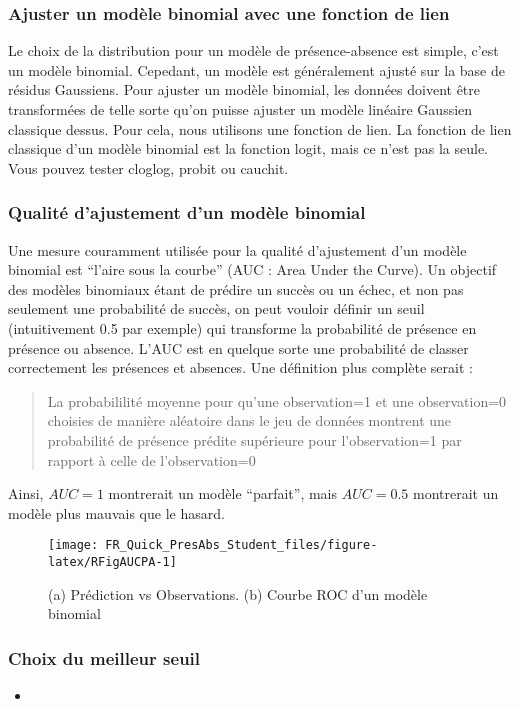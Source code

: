 \documentclass[french,a4paper]{article}
\providecommand{\tightlist}{%
  \setlength{\itemsep}{0pt}\setlength{\parskip}{0pt}}
\begin{document}
\subsubsection{Ajuster un modèle binomial avec une fonction de
lien}\label{ajuster-un-modele-binomial-avec-une-fonction-de-lien}

Le choix de la distribution pour un modèle de présence-absence est
simple, c'est un modèle binomial. Cepedant, un modèle est généralement
ajusté sur la base de résidus Gaussiens. Pour ajuster un modèle
binomial, les données doivent être transformées de telle sorte qu'on
puisse ajuster un modèle linéaire Gaussien classique dessus. Pour cela,
nous utilisons une fonction de lien. La fonction de lien classique d'un
modèle binomial est la fonction logit, mais ce n'est pas la seule. Vous
pouvez tester cloglog, probit ou cauchit.

\subsubsection{Qualité d'ajustement d'un modèle
binomial}\label{qualite-dajustement-dun-modele-binomial}

Une mesure couramment utilisée pour la qualité d'ajustement d'un modèle
binomial est ``l'aire sous la courbe'' (AUC : Area Under the Curve). Un
objectif des modèles binomiaux étant de prédire un succès ou un échec,
et non pas seulement une probabilité de succès, on peut vouloir définir
un seuil (intuitivement 0.5 par exemple) qui transforme la probabilité
de présence en présence ou absence. L'AUC est en quelque sorte une
probabilité de classer correctement les présences et absences. Une
définition plus complète serait :

\begin{quote}
La probabililité moyenne pour qu'une observation=1 et une observation=0
choisies de manière aléatoire dans le jeu de données montrent une
probabilité de présence prédite supérieure pour l'observation=1 par
rapport à celle de l'observation=0
\end{quote}

Ainsi, \(AUC = 1\) montrerait un modèle ``parfait'', mais \(AUC = 0.5\)
montrerait un modèle plus mauvais que le hasard.




\begin{figure}[!h]

{\centering \texttt{[image: FR\_Quick\_PresAbs\_Student\_files/figure-latex/RFigAUCPA-1]} 

}

\caption{(a) Prédiction vs Observations. (b) Courbe ROC d'un
modèle binomial}\label{fig:RFigAUCPA}
\end{figure}

\subsubsection{Choix du meilleur seuil}\label{choix-du-meilleur-seuil}

\begin{itemize}
\tightlist
\item
\end{itemize}
\end{document}
